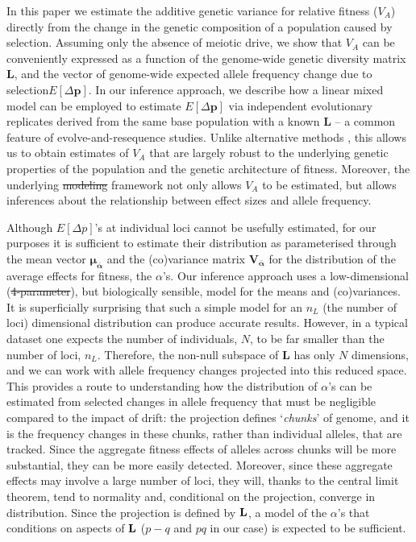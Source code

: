 \documentclass[12pt]{article}
\makeatletter
\providecommand{\DIFaddtex}[1]{{\protect\color{blue}\uwave{#1}}} %
\providecommand{\DIFdeltex}[1]{{\protect\color{red}\sout{#1}}} %
\providecommand{\DIFaddbegin}{} %
\providecommand{\DIFaddend}{} %
\providecommand{\DIFdelbegin}{} %
\providecommand{\DIFdelend}{} %
\providecommand{\DIFadd}[1]{\texorpdfstring{\DIFaddtex{#1}}{#1}} %
\providecommand{\DIFdel}[1]{\texorpdfstring{\DIFdeltex{#1}}{}} %
\newcommand{\DIFscaledelfig}{0.5}
\newlength{\DIFdelgraphicswidth} %
\newlength{\DIFdelgraphicsheight} %
\newcommand{\DIFaddincludegraphics}[2][]{{\color{blue}\fbox{\DIFOincludegraphics[#1]{#2}}}} %
\newcommand{\DIFdelincludegraphics}[2][]{%
\sbox{\DIFdelgraphicsbox}{\DIFOincludegraphics[#1]{#2}}%
\settoboxwidth{\DIFdelgraphicswidth}{\DIFdelgraphicsbox} %
\settoboxtotalheight{\DIFdelgraphicsheight}{\DIFdelgraphicsbox} %
\scalebox{\DIFscaledelfig}{%
\parbox[b]{\DIFdelgraphicswidth}{\usebox{\DIFdelgraphicsbox}\\[-\baselineskip] \rule{\DIFdelgraphicswidth}{0em}}\llap{\resizebox{\DIFdelgraphicswidth}{\DIFdelgraphicsheight}{%
\setlength{\unitlength}{\DIFdelgraphicswidth}%
\begin{picture}(1,1)%
\thicklines\linethickness{2pt} %
{\color[rgb]{1,0,0}\put(0,0){\framebox(1,1){}}}%
{\color[rgb]{1,0,0}\put(0,0){\line( 1,1){1}}}%
{\color[rgb]{1,0,0}\put(0,1){\line(1,-1){1}}}%
\end{picture}%
}\hspace*{3pt}}} %
} %
\DeclareRobustCommand{\DIFaddbegin}{\DIFOaddbegin \let\includegraphics\DIFaddincludegraphics} %
\DeclareRobustCommand{\DIFaddend}{\DIFOaddend \let\includegraphics\DIFOincludegraphics} %
\DeclareRobustCommand{\DIFdelbegin}{\DIFOdelbegin \let\includegraphics\DIFdelincludegraphics} %
\DeclareRobustCommand{\DIFdelend}{\DIFOaddend \let\includegraphics\DIFOincludegraphics} %
\let\sout@orig\sout %
\renewcommand{\sout}[1]{\ifmmode\text{\sout@orig{\ensuremath{#1}}}\else\sout@orig{#1}\fi} %
\makeatother
\begin{document}
\begin{bibunit}
In this paper we estimate the additive genetic variance for relative fitness ($V_A$) directly from the change in the genetic composition of a population caused by selection. Assuming only the absence of meiotic drive, we show that $V_A$ can be conveniently expressed as a function of the genome-wide genetic diversity matrix $\textbf{L}$, and the vector of genome-wide expected allele frequency change due to selection\DIFaddbegin \DIFadd{, }\DIFaddend $E[\Delta{\textbf{p}}]$. In our inference approach, we describe how a linear mixed model can be employed to estimate $E[\Delta{\textbf{p}}]$ via independent evolutionary replicates derived from the same base population with a known $\textbf{L}$ -- a common feature of evolve-and-resequence studies.  Unlike alternative methods \citep{buffalo2019linked}, this allows us to obtain estimates of $V_A$ that are largely robust to the underlying genetic properties of the population and the genetic architecture of fitness. Moreover, the underlying \DIFdelbegin \DIFdel{modeling }\DIFdelend \DIFaddbegin \DIFadd{modelling }\DIFaddend framework not only allows $V_A$ to be estimated, but allows inferences about the relationship between effect sizes and allele frequency.    

Although $E[\Delta{p}]$'s at individual loci cannot be usefully estimated, for our purposes it is sufficient to estimate their distribution as parameterised through the mean vector $\boldsymbol{\mu_{\bar{\alpha}}}$ and the (co)variance matrix $\boldsymbol{V_{\bar{\alpha}}}$ for the distribution of the average effects for fitness, the $\alpha$'s. Our inference approach uses a low-dimensional (\DIFdelbegin \DIFdel{4-parameter}\DIFdelend \DIFaddbegin \DIFadd{3-parameter}\DIFaddend ), but biologically sensible, model for the means and (co)variances. It is superficially surprising that such a simple model for an $n_L$ (the number of loci) dimensional distribution can produce accurate results. However, in a typical dataset one expects the number of individuals, $N$, to be far smaller than the number of loci, $n_L$. Therefore, the non-null subspace of $\textbf{L}$ has only $N$ dimensions, and we can work with allele frequency changes projected into this reduced space. This provides a route to understanding how the distribution of $\alpha$'s can be estimated from selected changes in allele frequency that must be negligible compared to the impact of drift: the projection defines `\emph{chunks}' of genome, and it is the frequency changes in these chunks, rather than individual alleles, that are tracked. Since the aggregate fitness effects of alleles across chunks will be more substantial, they can be more easily detected. Moreover, since these aggregate effects may involve a large number of loci, they will, thanks to the central limit theorem, tend to normality and, conditional on the projection, converge in distribution. Since the projection is defined by ${\bf L}$, a model of the $\alpha$'s that conditions on aspects of ${\bf L}$ ($p-q$ and $pq$ in our case) is expected to be sufficient.      


\end{bibunit}
\end{document}
